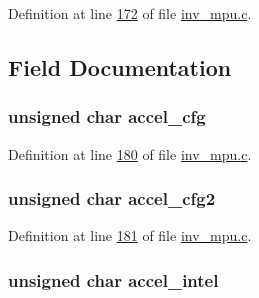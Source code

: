 Definition at line \hyperlink{inv__mpu_8c_source_l00172}{172} of file \hyperlink{inv__mpu_8c_source}{inv\+\_\+mpu.\+c}.



\subsection{Field Documentation}
\subsubsection[{\texorpdfstring{accel\+\_\+cfg}{accel_cfg}}]{\setlength{\rightskip}{0pt plus 5cm}unsigned char accel\+\_\+cfg}\hypertarget{structgyro__reg__s_a3e39cea9e122765d4770876d4ce6adc7}{}\label{structgyro__reg__s_a3e39cea9e122765d4770876d4ce6adc7}


Definition at line \hyperlink{inv__mpu_8c_source_l00180}{180} of file \hyperlink{inv__mpu_8c_source}{inv\+\_\+mpu.\+c}.

\subsubsection[{\texorpdfstring{accel\+\_\+cfg2}{accel_cfg2}}]{\setlength{\rightskip}{0pt plus 5cm}unsigned char accel\+\_\+cfg2}\hypertarget{structgyro__reg__s_a4878318dd0c9243015d4963e00b2d954}{}\label{structgyro__reg__s_a4878318dd0c9243015d4963e00b2d954}


Definition at line \hyperlink{inv__mpu_8c_source_l00181}{181} of file \hyperlink{inv__mpu_8c_source}{inv\+\_\+mpu.\+c}.

\subsubsection[{\texorpdfstring{accel\+\_\+intel}{accel_intel}}]{\setlength{\rightskip}{0pt plus 5cm}unsigned char accel\+\_\+intel}\hypertarget{structgyro__reg__s_a9c4b97b2bf0f2fcee9538e74fcaf5c3f}{}\label{structgyro__reg__s_a9c4b97b2bf0f2fcee9538e74fcaf5c3f}


